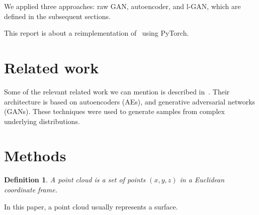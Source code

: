\documentclass[12pt]{article}
\newtheorem{definition}{Definition}
\newcommand{\contentdescription}[1]{}
\begin{document}
    We applied three approaches: raw GAN, autoencoder, and l-GAN, which are defined in the subsequent sections.

    This report is about a reimplementation of~\cite{pmlr-v80-achlioptas18a} using PyTorch.


    \section{Related work}
    \contentdescription{
        Related Work (5-15\%):
        Discuss the published work related to your project paper, the types of experiments you do and the additional method that you have added to this work or you have compared this paper with (if any).
    }

    Some of the relevant related work we can mention is described in~\cite{arxiv:1612.00593}.
    Their architecture is based on autoencoders (AEs)\cite{doi:10.5555/65669.104451}\cite{arxiv:1312.6114},
    and generative adversarial networks (GANs)\cite{NIPS2014_5ca3e9b1}\cite{arxiv:1511.06434}\cite{arxiv:1612.02136}.
    These techniques were used to generate samples from complex underlying distributions.


    \section{Methods}
    \contentdescription{
        Methods (15-25\%):
        Describe the original paper's method to the extent that you would need to make your report and findings understandable.
        Otherwise, here you can describe other methods that you compare with or other methods that you apply on top of what you reimplemented.
        Here, you also try to justify any methodical modification or incremental changes that you have added to the original paper.
        It may be helpful to include figures, diagrams, or tables to describe your method or compare it with other methods.
    }

    \begin{definition}
        \normalfont
        A \emph{point cloud} is a set of points $(x, y, z)$ in a Euclidean coordinate frame.
    \end{definition}

    In this paper, a point cloud usually represents a surface.
\end{document}
